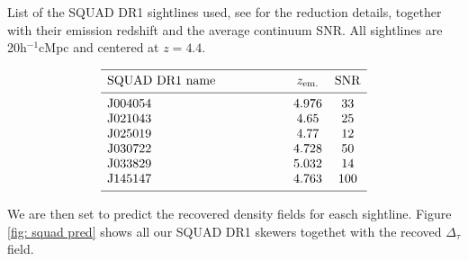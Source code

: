 \begin{table}
    \caption[]{List of the SQUAD DR1 sightlines used, see \cite{Murphy_2018} for the reduction details, together with their emission redshift and the average continuum SNR.     
    All sightlines are 20h$^{-1}$cMpc and centered at $z=4.4$.}
    \label{tab: squad dr1}
   $$ 
       \begin{array}{p{0.4\linewidth}cc}
          \hline
          \noalign{\smallskip}
          SQUAD DR1 name &  z_{\mathrm{em.}} & \mathrm{SNR} \\ 
          \noalign{\smallskip}
          \hline
          \noalign{\smallskip}
          J004054 &4.976  & 33    \\
          J021043           &4.65   &25\\
          J025019     &4.77   &     12      \\
          J030722     &4.728        &   50          \\
          J033829 &  5.032             &  14         \\
          J145147  & 4.763                 &  100         \\
          \noalign{\smallskip}
          \hline
       \end{array}
   $$ 
 \end{table}


We are then set to predict the recovered density fields for easch sightline. Figure \ref{fig: squad pred} shows all our SQUAD DR1 skewers togethet with the recoved $\Delta_\tau$ field.

